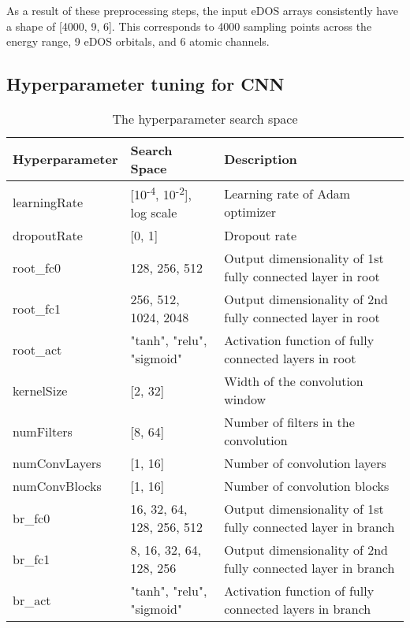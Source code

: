 As a result of these preprocessing steps, the input eDOS arrays consistently have a shape of [4000, 9, 6]. This corresponds to 4000 sampling points across the energy range, 9 eDOS orbitals, and 6 atomic channels.


\subsection{Hyperparameter tuning for CNN}

\begin{table}[h]
  \centering
  \begin{tabular}{lll}
    \hline
    \textbf{Hyperparameter} & \textbf{Search Space}                             & \textbf{Description}            \\
    \hline
    learningRate  & [10\textsuperscript{-4}, 10\textsuperscript{-2}], log scale & Learning rate of Adam optimizer \\
    dropoutRate   & [0, 1]                    & Dropout rate                                                      \\
    root\_fc0     & 128, 256, 512             & Output dimensionality of 1st fully connected layer in root        \\
    root\_fc1     & 256, 512, 1024, 2048      & Output dimensionality of 2nd fully connected layer in root        \\
    root\_act     & "tanh", "relu", "sigmoid" & Activation function of fully connected layers in root             \\
    kernelSize    & [2, 32]                   & Width of the convolution window                                   \\
    numFilters    & [8, 64]                   & Number of filters in the convolution                              \\
    numConvLayers & [1, 16]                   & Number of convolution layers                                      \\
    numConvBlocks & [1, 16]                   & Number of convolution blocks                                      \\
    br\_fc0       & 16, 32, 64, 128, 256, 512 & Output dimensionality of 1st fully connected layer in branch      \\
    br\_fc1       & 8, 16, 32, 64, 128, 256   & Output dimensionality of 2nd fully connected layer in branch      \\
    br\_act       & "tanh", "relu", "sigmoid" & Activation function of fully connected layers in branch           \\
    \hline
  \end{tabular}
  \caption{The hyperparameter search space}
  \label{si_table16}
\end{table}



